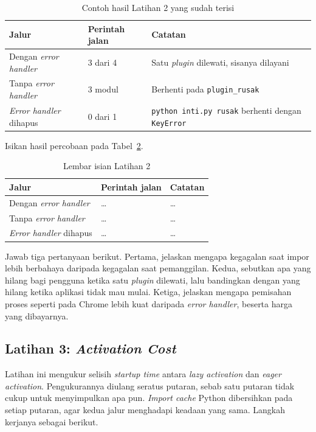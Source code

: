 \begin{table}[htbp]
  \centering
  \caption{Contoh hasil Latihan 2 yang sudah terisi}
  \label{tab:lat2plugin-contoh}
  \begin{tabularx}{\textwidth}{|l|l|X|}
    \hline
    \textbf{Jalur} & \textbf{Perintah jalan} & \textbf{Catatan} \\
    \hline
    Dengan \textit{error handler} & 3 dari 4 & Satu \textit{plugin} dilewati, sisanya dilayani \\
    \hline
    Tanpa \textit{error handler} & 3 modul & Berhenti pada \texttt{plugin\_rusak} \\
    \hline
    \textit{Error handler} dihapus & 0 dari 1 & \texttt{python inti.py rusak} berhenti dengan \texttt{KeyError} \\
    \hline
  \end{tabularx}
\end{table}

Isikan hasil percobaan pada Tabel~\ref{tab:lat2plugin-hasil}.

\begin{table}[htbp]
  \centering
  \caption{Lembar isian Latihan 2}
  \label{tab:lat2plugin-hasil}
  \begin{tabularx}{\textwidth}{|l|l|X|}
    \hline
    \textbf{Jalur} & \textbf{Perintah jalan} & \textbf{Catatan} \\
    \hline
    Dengan \textit{error handler} & \dots & \dots \\
    \hline
    Tanpa \textit{error handler} & \dots & \dots \\
    \hline
    \textit{Error handler} dihapus & \dots & \dots \\
    \hline
  \end{tabularx}
\end{table}

Jawab tiga pertanyaan berikut. Pertama, jelaskan mengapa kegagalan saat impor
lebih berbahaya daripada kegagalan saat pemanggilan. Kedua, sebutkan apa yang
hilang bagi pengguna ketika satu \textit{plugin} dilewati, lalu bandingkan
dengan yang hilang ketika aplikasi tidak mau mulai. Ketiga, jelaskan mengapa
pemisahan proses seperti pada Chrome lebih kuat daripada \textit{error handler},
beserta harga yang dibayarnya.

\subsection*{Latihan 3: \textit{Activation Cost}}

Latihan ini mengukur selisih \textit{startup time} antara \textit{lazy activation} dan \textit{eager activation}. Pengukurannya diulang seratus putaran, sebab satu putaran tidak cukup
untuk menyimpulkan apa pun. \textit{Import cache} Python dibersihkan pada setiap putaran,
agar kedua jalur menghadapi keadaan yang sama. Langkah kerjanya sebagai berikut.

